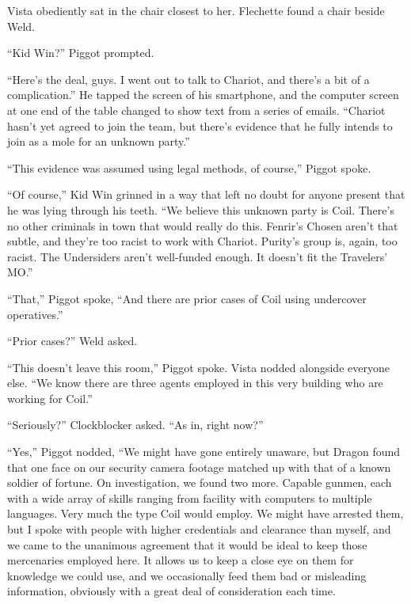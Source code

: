 Vista obediently sat in the chair closest to her.  Flechette found a chair beside Weld.



``Kid Win?'' Piggot prompted.



``Here's the deal, guys.  I went out to talk to Chariot, and there's a bit of a complication.''  He tapped the screen of his smartphone, and the computer screen at one end of the table changed to show text from a series of emails.  ``Chariot hasn't yet agreed to join the team, but there's evidence that he fully intends to join as a mole for an unknown party.''



``This evidence was assumed using legal methods, of course,'' Piggot spoke.



``Of course,'' Kid Win grinned in a way that left no doubt for anyone present that he was lying through his teeth.  ``We believe this unknown party is Coil.  There's no other criminals in town that would really do this.  Fenrir's Chosen aren't that subtle, and they're too racist to work with Chariot.  Purity's group is, again, too racist.  The Undersiders aren't well-funded enough.  It doesn't fit the Travelers' MO.''



``That,'' Piggot spoke, ``And there are prior cases of Coil using undercover operatives.''



``Prior cases?'' Weld asked.



``This doesn't leave this room,'' Piggot spoke.  Vista nodded alongside everyone else.  ``We know there are three agents employed in this very building who are working for Coil.''



``Seriously?'' Clockblocker asked.  ``As in, right now?''



``Yes,'' Piggot nodded, ``We might have gone entirely unaware, but Dragon found that one face on our security camera footage matched up with that of a known soldier of fortune.  On investigation, we found two more.  Capable gunmen, each with a wide array of skills ranging from facility with computers to multiple languages.  Very much the type Coil would employ.  We might have arrested them, but I spoke with people with higher credentials and clearance than myself, and we came to the unanimous agreement that it would be ideal to keep those mercenaries employed here.  It allows us to keep a close eye on them for knowledge we could use, and we occasionally feed them bad or misleading information, obviously with a great deal of consideration each time.



